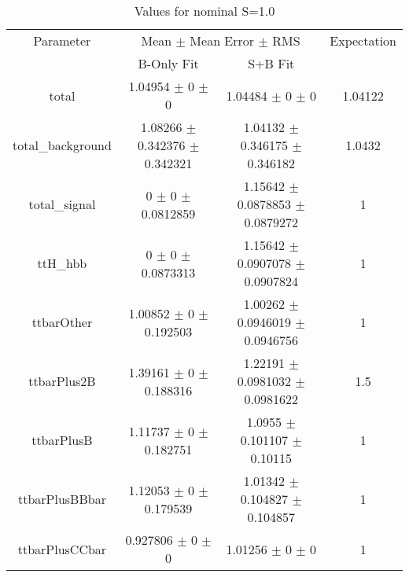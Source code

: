 \begin{table}
\centering
\caption{Values for nominal S=1.0}
\begin{tabular}{cccc}
\toprule
Parameter & \multicolumn{2}{c}{Mean $\pm$ Mean Error $\pm$ RMS} & Expectation\\
 & B-Only Fit & S+B Fit & \\
\midrule
total & \num{1.04954} $\pm$ \num{0} $\pm$ \num{0} & \num{1.04484} $\pm$ \num{0} $\pm$ \num{0} & \num{1.04122}\\
total\_background & \num{1.08266} $\pm$ \num{0.342376} $\pm$ \num{0.342321} & \num{1.04132} $\pm$ \num{0.346175} $\pm$ \num{0.346182} & \num{1.0432}\\
total\_signal & \num{0} $\pm$ \num{0} $\pm$ \num{0.0812859} & \num{1.15642} $\pm$ \num{0.0878853} $\pm$ \num{0.0879272} & \num{1}\\
ttH\_hbb & \num{0} $\pm$ \num{0} $\pm$ \num{0.0873313} & \num{1.15642} $\pm$ \num{0.0907078} $\pm$ \num{0.0907824} & \num{1}\\
ttbarOther & \num{1.00852} $\pm$ \num{0} $\pm$ \num{0.192503} & \num{1.00262} $\pm$ \num{0.0946019} $\pm$ \num{0.0946756} & \num{1}\\
ttbarPlus2B & \num{1.39161} $\pm$ \num{0} $\pm$ \num{0.188316} & \num{1.22191} $\pm$ \num{0.0981032} $\pm$ \num{0.0981622} & \num{1.5}\\
ttbarPlusB & \num{1.11737} $\pm$ \num{0} $\pm$ \num{0.182751} & \num{1.0955} $\pm$ \num{0.101107} $\pm$ \num{0.10115} & \num{1}\\
ttbarPlusBBbar & \num{1.12053} $\pm$ \num{0} $\pm$ \num{0.179539} & \num{1.01342} $\pm$ \num{0.104827} $\pm$ \num{0.104857} & \num{1}\\
ttbarPlusCCbar & \num{0.927806} $\pm$ \num{0} $\pm$ \num{0} & \num{1.01256} $\pm$ \num{0} $\pm$ \num{0} & \num{1}\\
\bottomrule
\end{tabular}
\end{table}